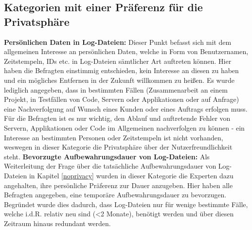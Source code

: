 \subsection{Kategorien mit einer Präferenz für die Privatsphäre} \label{privacy}
\textbf{Persönlichen Daten in Log-Dateien:} \newline
Dieser Punkt befasst sich mit dem allgemeinen Interesse an persönlichen Daten, welche in Form von Benutzernamen, Zeitstempeln, IDs etc. in Log-Dateien sämtlicher Art auftreten können. Hier haben die Befragten einstimmig
entschieden, kein Interesse an diesen zu haben und ein mögliches Entfernen in der Zukunft willkommen zu heißen. Es wurde lediglich angegeben, dass in bestimmten Fällen (Zusammenarbeit an einem Projekt, 
in Testfällen von Code, Servern oder Applikationen oder auf Anfrage) eine Nachverfolgung auf Wunsch eines Kunden oder eines Auftrags erfolgen muss. Für die Befragten ist es nur wichtig, den Ablauf und auftretende Fehler 
von Servern, Applikationen oder Code im Allgemeinen nachverfolgen zu können - ein Interesse an bestimmten Personen oder Zeitstempeln ist nicht vorhanden, weswegen in dieser Kategorie die Privatsphäre über der Nutzerfreundlichkeit
steht. \newline \newline
\textbf{Bevorzugte Aufbewahrungsdauer von Log-Dateien:} \newline
Als Weiterleitung der Frage über die tatsächliche Aufbewahrungsdauer von Log-Dateien in Kapitel \ref{noprivacy} wurden in dieser Kategorie die Experten dazu angehalten, ihre persönliche Präferenz zur Dauer anzugeben. Hier haben alle 
Befragten angegeben, eine temporäre Aufbewahrungsdauer zu bevorzugen. Begründet wurde dies dadurch, dass Log-Dateien nur für wenige bestimmte Fälle, welche i.d.R. relativ neu sind (<2 Monate), benötigt werden und über diesen Zeitraum
hinaus redundant werden. \newline \newline

